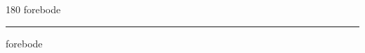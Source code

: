 
\begin{frame}
\begin{center}
\begin{turn}{180}
{\fontsize{2.5cm}{1em}\selectfont forebode}
\end{turn}
\vspace{1em}\par  
\hrule
\vspace{1em}\par  
{\fontsize{2.5cm}{1em}\selectfont forebode}
\end{center}
\end{frame}
